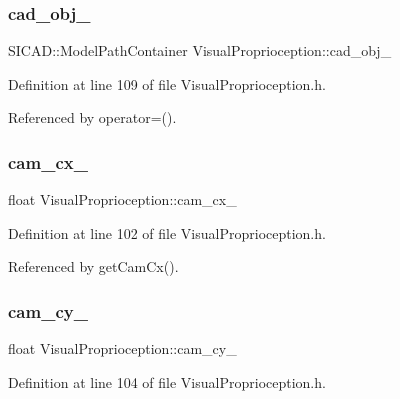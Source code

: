 \subsubsection{\texorpdfstring{cad\+\_\+obj\+\_\+}{cad\_obj\_}}
{\footnotesize\ttfamily S\+I\+C\+A\+D\+::\+Model\+Path\+Container Visual\+Proprioception\+::cad\+\_\+obj\+\_\+\hspace{0.3cm}{\ttfamily [protected]}}



Definition at line 109 of file Visual\+Proprioception.\+h.



Referenced by operator=().

\mbox{\label{classVisualProprioception_a8539c7bfe046289d21f82c3617da7896}} 
\subsubsection{\texorpdfstring{cam\+\_\+cx\+\_\+}{cam\_cx\_}}
{\footnotesize\ttfamily float Visual\+Proprioception\+::cam\+\_\+cx\+\_\+\hspace{0.3cm}{\ttfamily [protected]}}



Definition at line 102 of file Visual\+Proprioception.\+h.



Referenced by get\+Cam\+Cx().

\mbox{\label{classVisualProprioception_ada8161ede00c312b8b2422deb5aa29e7}} 
\subsubsection{\texorpdfstring{cam\+\_\+cy\+\_\+}{cam\_cy\_}}
{\footnotesize\ttfamily float Visual\+Proprioception\+::cam\+\_\+cy\+\_\+\hspace{0.3cm}{\ttfamily [protected]}}



Definition at line 104 of file Visual\+Proprioception.\+h.




